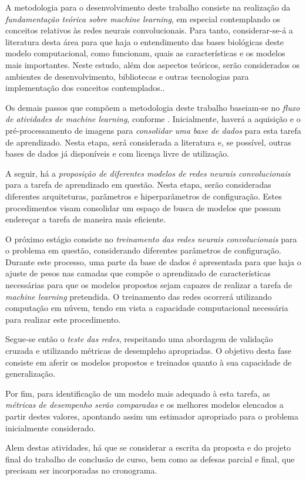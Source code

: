 A metodologia para o desenvolvimento deste trabalho consiste na realização da \emph{fundamentação teórica sobre machine learning}, em especial contemplando os conceitos relativos às redes neurais convolucionais. Para tanto, considerar-se-á a literatura desta área para que haja o entendimento das bases biológicas deste modelo computacional, como funcionam, quais as características e os modelos mais importantes. Neste estudo, além dos aspectos teóricos, serão considerados os ambientes de desenvolvimento, bibliotecas e outras tecnologias para implementação dos conceitos contemplados..

Os demais passos que compõem a metodologia deste trabalho baseiam-se no \emph{fluxo de atividades de machine learning}, conforme \cite{marsland2015machine}. Inicialmente, haverá a aquisição e o pré-processamento de imagens para \emph{consolidar uma base de dados} para esta tarefa de aprendizado. Nesta etapa, será considerada a literatura e, se possível, outras bases de dados já disponíveis e com licença livre de utilização.

A seguir, há a \emph{proposição de diferentes modelos de redes neurais convolucionais} para a tarefa de aprendizado em questão. Nesta etapa, serão consideradas diferentes arquiteturas, parâmetros e hiperparâmetros de configuração. Estes procedimentos visam consolidar um espaço de busca de modelos que possam endereçar a tarefa de maneira mais eficiente.

O próximo estágio consiste no \emph{treinamento das redes neurais convolucionais} para o problema em questão, considerando diferentes parâmetros de configuração. Durante este processo, uma parte da base de dados é apresentada para que haja o ajuste de pesos nas camadas que compõe o aprendizado de características necessárias para que os modelos propostos sejam capazes de realizar a tarefa de \emph{machine learning} pretendida. O treinamento das redes ocorrerá utilizando computação em núvem, tendo em vista a capacidade computacional necessária para realizar este procedimento.

Segue-se então o \emph{teste das redes}, respeitando uma abordagem de validação cruzada e utilizando métricas de desempleho apropriadas. O objetivo desta fase consiste em aferir os modelos propostos e treinados quanto à sua capacidade de generalização.

Por fim, para identificação de um modelo mais adequado à esta tarefa, as \emph{métricas de desempenho serão comparadas} e os melhores modelos elencados a partir destes valores, apontando assim um estimador apropriado para o problema inicialmente considerado.

Alem destas atividades, há que se considerar a escrita da proposta e do projeto final do trabalho de conclusão de curso, bem como as defesas parcial e final, que precisam ser incorporadas no cronograma.
